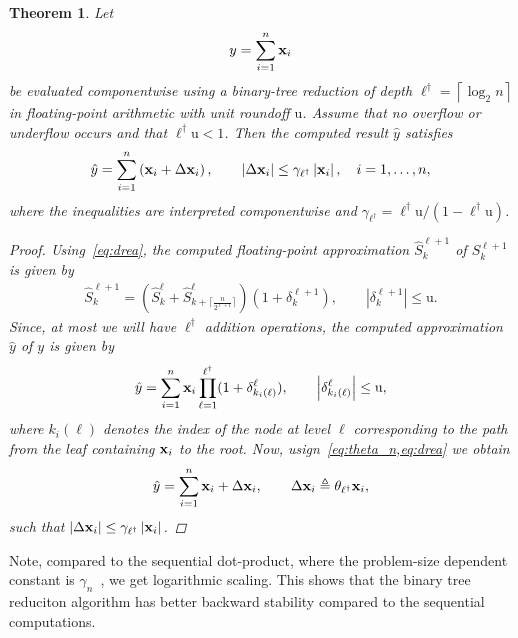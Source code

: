 \documentclass[11pt,draft]{article}
\newcommand{\urd}{\ensuremath{\mathrm{u}}}
\newcommand{\define}{\ensuremath{\triangleq}}
\newcommand{\vect}[1]{\mathbf{\MakeLowercase{#1}}}
\newtheorem{theorem}{Theorem}[section]
\theoremstyle{definition}
\theoremstyle{remark}
\newcommand{\abs}[1]{\left|#1\right|}
\newcommand{\ceil}[1]{\left\lceil #1 \right\rceil}
\begin{document}
\begin{theorem}
\label{theorem:parallel_binary_tree_reduction}
Let
\begin{align}
    y=\sum_{i=1}^{n}\vect{x}_i
\end{align}
be evaluated componentwise using a binary-tree reduction of depth
$\ell^\dagger=\ceil{\log_2 n}$ in floating-point arithmetic with unit
roundoff $\urd$. Assume that no overflow or underflow occurs and that
$\ell^\dagger\urd<1$. Then the computed result $\hat{y}$ satisfies
\begin{align}
    \hat{y}
    =\sum_{i=1}^{n}\left(\vect{x}_i+\Delta\vect{x}_i\right),
    \qquad
    \abs{\Delta\vect{x}_i}
    \leq \gamma_{\ell^\dagger}\abs{\vect{x}_i},
    \quad i=1,\ldots,n,
\end{align}
where the inequalities are interpreted componentwise and
$\gamma_{\ell^\dagger}=\ell^\dagger\urd/(1-\ell^\dagger\urd)$.
    \begin{proof}
        Using~\cref{eq:drea}, the computed floating-point approximation $\widehat{S}_k^{\ell+1}$ of $S_k^{\ell+1}$ is given by
        \begin{align}
            \widehat{S}_k^{\ell+1} = \left(\widehat{S}_k^{\ell}  + \widehat{S}_{k + \lceil\frac{n}{2^{\ell+1}}\rceil}^\ell\right )(1 + \delta_k^{\ell+1}), \qquad \abs{\delta_k^{\ell+1}} \leq \urd.
        \end{align}
    Since, at most we will have $\ell^\dagger$ addition operations, the computed approximation $\hat{y}$ of $y$ is given by
    \begin{align}
        \hat{y} = \sum_{i=1}^n \vect{x}_i \prod_{\ell=1}^{\ell^\dagger} (1 + \delta_{k_i(\ell)}^\ell), \qquad \abs{\delta_{k_i(\ell)}^\ell} \leq \urd,
    \end{align}
    where $k_i(\ell)$ denotes the index of the node at level $\ell$ corresponding to the path from the leaf containing $\vect{x}_i$ to the root.
    Now, usign~\cref{eq:theta_n,eq:drea} we obtain
    \begin{align}
        \hat{y} = \sum_{i=1}^n \vect{x}_i + \Delta \vect{x}_i, \qquad \Delta \vect{x}_i \define \theta_{\ell^\dagger}\vect{x}_i,
    \end{align}
    such that $\abs{\Delta \vect{x}_i} \leq \gamma_{\ell^\dagger} \abs{\vect{x}_i}$.
    \end{proof}
\end{theorem}

Note, compared to the sequential dot-product, where the problem-size dependent constant is $\gamma_n$~\cite{higham2002accuracy}, we get logarithmic scaling.
This shows that the binary tree reduciton algorithm has better backward stability compared to the sequential computations.
\end{document}
